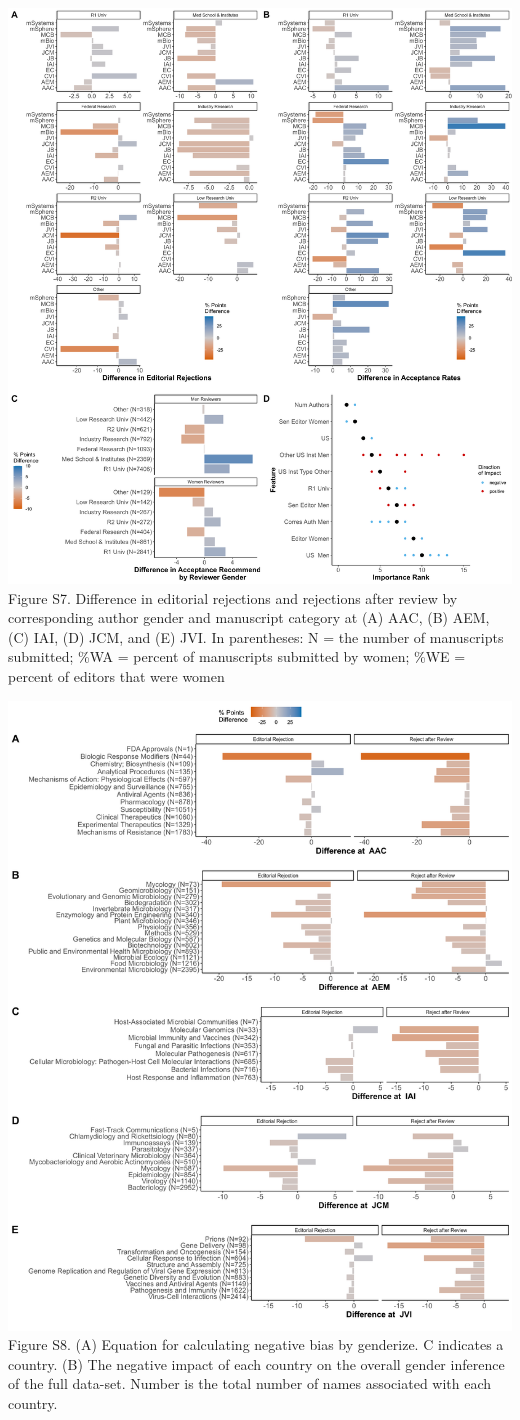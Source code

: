 \documentclass[11pt,]{article}
\begin{document}
\includegraphics{Figure_S7.png} Figure S7. Difference in editorial
rejections and rejections after review by corresponding author gender
and manuscript category at (A) AAC, (B) AEM, (C) IAI, (D) JCM, and (E)
JVI. In parentheses: N = the number of manuscripts submitted; \%WA =
percent of manuscripts submitted by women; \%WE = percent of editors
that were women

\newpage

\includegraphics{Figure_S8.png} Figure S8. (A) Equation for calculating
negative bias by genderize. C indicates a country. (B) The negative
impact of each country on the overall gender inference of the full
data-set. Number is the total number of names associated with each
country.
\end{document}
